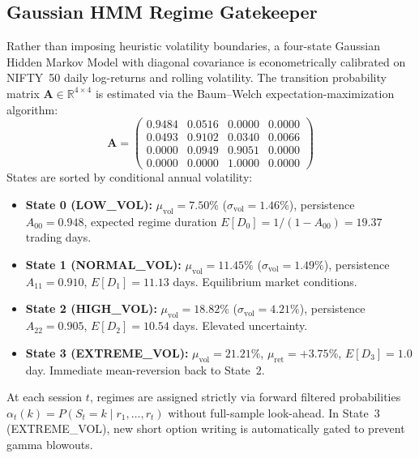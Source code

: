 \documentclass[journal]{IEEEtran}
\begin{document}
\subsection{Gaussian HMM Regime Gatekeeper}
Rather than imposing heuristic volatility boundaries, a four-state Gaussian Hidden Markov Model with diagonal covariance is econometrically calibrated on NIFTY~50 daily log-returns and rolling volatility. The transition probability matrix $\mathbf{A} \in \mathbb{R}^{4 \times 4}$ is estimated via the Baum--Welch expectation-maximization algorithm:
\begin{equation}
\mathbf{A} = \begin{pmatrix}
0.9484 & 0.0516 & 0.0000 & 0.0000 \\
0.0493 & 0.9102 & 0.0340 & 0.0066 \\
0.0000 & 0.0949 & 0.9051 & 0.0000 \\
0.0000 & 0.0000 & 1.0000 & 0.0000
\end{pmatrix}
\end{equation}
States are sorted by conditional annual volatility:
\begin{itemize}
    \item \textbf{State 0 (LOW\_VOL):} $\mu_{\mathrm{vol}} = 7.50\%$ ($\sigma_{\mathrm{vol}} = 1.46\%$), persistence $A_{00} = 0.948$, expected regime duration $E[D_0] = 1/(1-A_{00}) = 19.37$ trading days.
    \item \textbf{State 1 (NORMAL\_VOL):} $\mu_{\mathrm{vol}} = 11.45\%$ ($\sigma_{\mathrm{vol}} = 1.49\%$), persistence $A_{11} = 0.910$, $E[D_1] = 11.13$ days. Equilibrium market conditions.
    \item \textbf{State 2 (HIGH\_VOL):} $\mu_{\mathrm{vol}} = 18.82\%$ ($\sigma_{\mathrm{vol}} = 4.21\%$), persistence $A_{22} = 0.905$, $E[D_2] = 10.54$ days. Elevated uncertainty.
    \item \textbf{State 3 (EXTREME\_VOL):} $\mu_{\mathrm{vol}} = 21.21\%$, $\mu_{\mathrm{ret}} = +3.75\%$, $E[D_3] = 1.0$ day. Immediate mean-reversion back to State~2.
\end{itemize}
At each session $t$, regimes are assigned strictly via forward filtered probabilities $\alpha_t(k) = P(S_t = k \mid r_1, \dots, r_t)$ without full-sample look-ahead. In State~3 (EXTREME\_VOL), new short option writing is automatically gated to prevent gamma blowouts.
\end{document}
